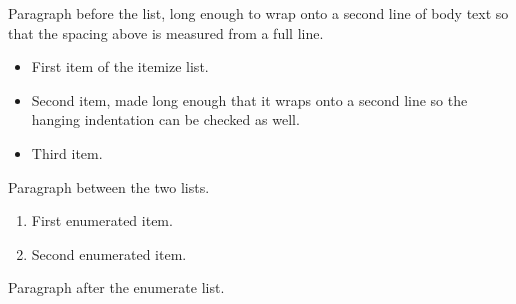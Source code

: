 \documentclass[a4paper,10pt]{article}
\begin{document}
Paragraph before the list, long enough to wrap onto a second line of body
text so that the spacing above is measured from a full line.

\begin{itemize}
\item First item of the itemize list.
\item Second item, made long enough that it wraps onto a second line so the
hanging indentation can be checked as well.
\item Third item.
\end{itemize}

Paragraph between the two lists.

\begin{enumerate}
\item First enumerated item.
\item Second enumerated item.
\end{enumerate}

Paragraph after the enumerate list.
\end{document}
